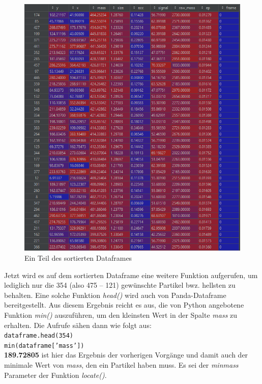 \begin{enumerate}
\begin{figure}[H]
    \centering
    \includegraphics[scale=0.9]{Grafiken/trackpyBilder/df_sorted.png}
    \caption{Ein Teil des sortierten Dataframes}
    \label{fig:kap3_halbsortDataframes}
\end{figure}

Jetzt wird es auf dem sortierten Dataframe eine weitere Funktion aufgerufen, um lediglich nur die 354 (also 475 -- 121) gewünschte Partikel bwz. hellsten zu behalten. Eine solche Funktion \textit{head()} wird auch von Panda-Dataframe bereitgestellt. Aus diesem Ergebnis reicht es aus, die von Python angebotene Funktion \textit{min()} auszuführen, um den kleinsten Wert in der Spalte \textit{mass} zu erhalten. 
Die Aufrufe sähen dann wie folgt aus:\\
\texttt{dataframe.head(354)} \\
\texttt{min(dataframe['mass'])}\\

\textbf{189.72805} ist hier das Ergebnis der vorherigen Vorgänge und damit auch der minimale Wert von \textit{mass}, den ein Partikel haben muss. Es sei der \textit{minmass} Parameter der Funktion \textit{locate()}.




\end{enumerate}
